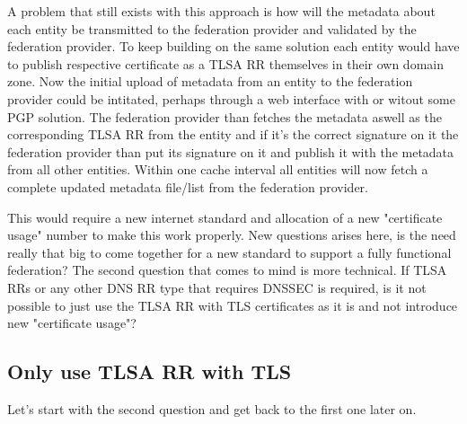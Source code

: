 A problem that still exists with this approach is how will the metadata about each entity be transmitted to the federation provider and validated by the federation provider.
To keep building on the same solution each entity would have to publish respective certificate as a TLSA RR themselves in their own domain zone.
Now the initial upload of metadata from an entity to the federation provider could be intitated, perhaps through a web interface with or witout some PGP solution.
The federation provider than fetches the metadata aswell as the corresponding TLSA RR from the entity and if it's the correct signature on it the federation provider than put its signature on it and publish it with the metadata from all other entities.
Within one cache interval all entities will now fetch a complete updated metadata file/list from the federation provider.


This would require a new internet standard and allocation of a new "certificate usage" number to make this work properly.
New questions arises here, is the need really that big to come together for a new standard to support a fully functional federation?
The second question that comes to mind is more technical.
If TLSA RRs or any other DNS RR type that requires DNSSEC is required, is it not possible to just use the TLSA RR with TLS certificates as it is and not introduce new "certificate usage"?

\subsection{Only use TLSA RR with TLS}
Let's start with the second question and get back to the first one later on.




